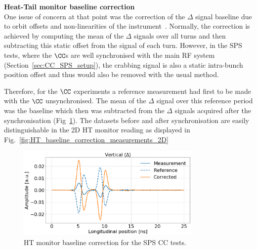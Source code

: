\normalsize{\textbf{Heat-Tail monitor baseline correction}}\\
One issue of concern at that point was the correction of the $\Delta$ signal  baseline due to orbit offsets and non-linearities of the instrument~\cite{Levens:2313358}.  %
Normally, the correction is achieved by computing the mean of the $\Delta$ signals over all turns and then subtracting this static offset from the signal of each turn. However, in the SPS tests, where the $\CC$s are well synchronised with the main RF system (Section~\ref{sec:CC_SPS_setup}), the crabbing signal is also a static intra-bunch position offset and thus would also be removed with the usual method.

Therefore, for the $\CC$ experiments a reference measurement had first to be made with the $\CC$ unsynchronised. The mean of the $\Delta$ signal over this reference period was the baseline which then was subtracted from the $\Delta$ signals acquired after the synchronisation (Fig~\ref{fig:HT_baseline_correction}). The datasets before and after synchronisation are easily distinguishable in the 2D HT monitor reading as displayed in Fig.~\ref{fig:HT_baseline_correction_measurements_2D}

\begin{figure}[!h]
   \centering         
   \includegraphics[width=0.8\textwidth]{images/Ch4/HT_measures_vs_reference_vs_corrected__20180530_135105_baseline_correction.png}
       \caption{HT monitor baseline correction for the SPS CC tests.}
       \label{fig:HT_baseline_correction}
\end{figure}

